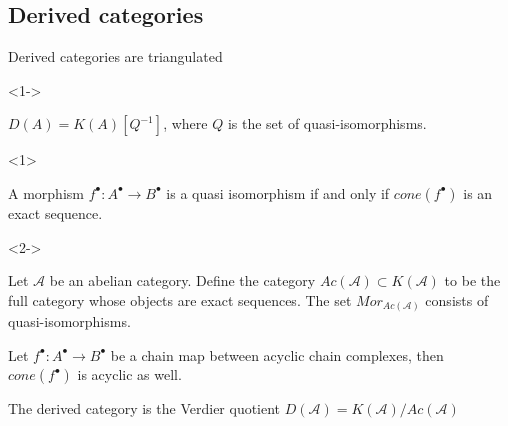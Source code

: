 \documentclass{beamer}
\newcommand{\chain}[1]{#1^{\bullet}}
\begin{document}
        \subsection{Derived categories}
            \begin{frame}{Derived categories are triangulated}
                \begin{onlyenv}<1->
                    \begin{definition}
                        $D(A)=K(A)[Q^{-1}]$, where $Q$ is the set of quasi-isomorphisms.
                    \end{definition}
                \end{onlyenv}
                \begin{onlyenv}<1>
                    \begin{lemma}
                        A morphism $\chain{f}:\chain{A}\rightarrow\chain{B}$ is a quasi isomorphism if and only if $cone(\chain{f})$ is an exact sequence.
                    \end{lemma}
                \end{onlyenv}
                \begin{onlyenv}<2->
                    \begin{definition}
                        Let $\mathcal{A}$ be an abelian category. Define the category $Ac(\mathcal{A})\subset K(\mathcal{A})$ to be the full category whose objects are exact sequences. The set $Mor_{Ac(\mathcal{A})}$ consists of quasi-isomorphisms.
                    \end{definition}
                    \begin{lemma}
                        Let $\chain{f}:\chain{A}\rightarrow\chain{B}$ be a chain map between acyclic chain complexes, then $cone(\chain{f})$ is acyclic as well.
                    \end{lemma}
                    \begin{theorem}
                        The derived category is the Verdier quotient $D(\mathcal{A})=K(\mathcal{A})/Ac(\mathcal{A})$
                    \end{theorem}
                \end{onlyenv}
            \end{frame}
\end{document}
